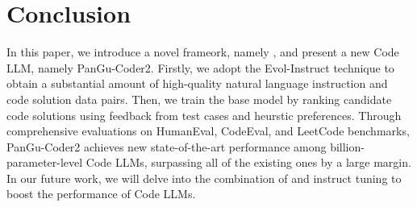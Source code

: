 \documentclass{article}
\newcommand{\pgcoder}{PanGu-Coder2\xspace}
\begin{document}
\section{Conclusion}
In this paper, we introduce a novel frameork, namely \rrtf, and present a new Code LLM, namely \pgcoder.
Firstly, we adopt the Evol-Instruct technique to obtain a substantial amount of high-quality natural language instruction and code solution data pairs.
Then, we train the base model by ranking candidate code solutions using feedback from test cases and heurstic preferences. Through comprehensive evaluations on HumanEval, CodeEval, and LeetCode benchmarks, \pgcoder achieves new state-of-the-art performance among billion-parameter-level Code LLMs, surpassing all of the existing ones by a large margin. In our future work, we will delve into the combination of \rrtf and instruct tuning to boost the performance of Code LLMs.





  
\end{document}
